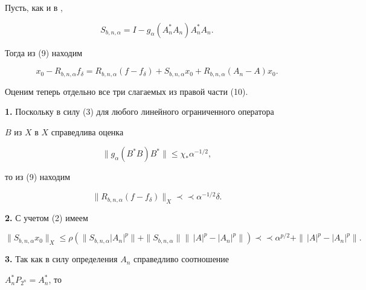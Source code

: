 \begin{pf} Пусть, как и в \cite{PV},


$$


S_{b,n,\alpha} = I - g_\alpha(A_n^*A_n)A_n^*A_n.


$$


Тогда из (9) находим


\begin{equation}


x_0 - R_{b,n,\alpha}f_\delta =


R_{b,n,\alpha}(f-f_\delta) + S_{b,n,\alpha}x_0  +


R_{b,n,\alpha}(A_n-A)x_0 .


\end{equation}


Оценим теперь отдельно все три слагаемых из правой части (10).





{\bf 1.} Поскольку в силу (3) для любого линейного ограниченного оператора


$B$ из $X$ в $X$ справедлива оценка


\begin{equation}


\|g_\alpha(B^*B)B^*\| \leq


\chi_*\alpha^{-1/2},


\end{equation}


то из (9) находим


$$


\|R_{b,n,\alpha}(f-f_\delta)\|_X \prec\prec \alpha^{-1/2}\delta.


$$





{\bf 2.} С учетом (2) имеем


$$


\|S_{b,n,\alpha}x_0\|_X \le \rho (


\|S_{b,n,\alpha}|A_n|^p\| + \|S_{b,n,\alpha}\|


\|\,|A|^p - |A_n|^p\|) \prec\prec


\alpha^{p/2} + \|\,|A|^p - |A_n|^p\|.


$$





{\bf 3.} Так как в силу определения $A_n$ справедливо соотношение


$A^*_nP_{2^n}= A^*_n$, то


$$



\end{pf}
